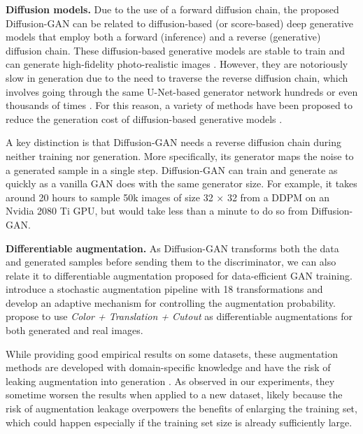 \documentclass{article} \usepackage{iclr2023_conference,times}
\theoremstyle{plain}
\theoremstyle{definition}
\theoremstyle{remark}
\begin{document}
\textbf{Diffusion models. } 
Due to the use of a forward diffusion chain, the proposed Diffusion-GAN can be related to 
diffusion-based (or score-based) deep generative models \citep{ddpm,SohlDickstein2015DeepUL,scorematching} that employ both a forward (inference) and a reverse (generative) diffusion chain.
These diffusion-based generative models  are stable to train and can generate high-fidelity photo-realistic images \citep{Dhariwal2021DiffusionMB,ddpm,nichol2021glide,ramesh2022hierarchical,scorematching,song2021scorebased}. However, they are notoriously slow in generation due to the need to traverse the reverse diffusion chain, which involves 
going through the same U-Net-based generator network hundreds or even thousands of times \citep{song2021denoising}. For this reason, a variety of methods have been proposed to reduce the generation cost of diffusion-based generative models \citep{kong2021fast,luhman2021knowledge,pandey2022diffusevae,san2021noise,song2021denoising,xiao2021tackling,zheng2022truncated}.



A key distinction is that Diffusion-GAN  needs a reverse diffusion chain during neither training nor  generation.
More specifically, its generator  
maps the noise to a generated sample in a single step.
Diffusion-GAN can train and generate as quickly as a vanilla GAN does with the same generator size. 
{For example, it takes around 20 hours to sample 50k images of size 32 × 32 from a DDPM \citep{ddpm} on an Nvidia 2080 Ti GPU, but would take less than a minute to do so from Diffusion-GAN.}

 





\textbf{Differentiable augmentation. }
As Diffusion-GAN 
transforms both the data and generated samples before sending them to the discriminator, we can also  relate it 
to differentiable augmentation  \citep{karras2020training, zhao2020differentiable} 
proposed for data-efficient GAN training. 
\citet{karras2020training} 
introduce a stochastic augmentation pipeline with 18 transformations and develop an adaptive mechanism for controlling the augmentation probability. \citet{zhao2020differentiable} propose to use \textit{Color + Translation + Cutout} as differentiable augmentations for both generated and real images.


While providing good empirical results on some datasets, these augmentation methods are developed with domain-specific knowledge and
have the risk of leaking augmentation into generation \citep{karras2020training}.
As observed in our experiments, they sometime worsen the results when applied to a new dataset, likely because the risk of augmentation leakage overpowers the benefits of enlarging the training set, which could happen especially if the training set size is already sufficiently large.
\end{document}
